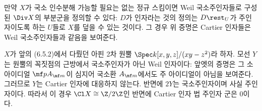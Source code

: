 	
	\begin{remark}
	만약 $X$가 국소 인수분해 가능할 필요는 없는 정규 스킴이면 Weil 국소주인자들로 구성된 $\Div X$의 부분군을 정의할 수 있다:
	$D$가 인자라는 것의 정의는 $D\rest_U$가 주인자이도록 하는 $U$들로 $X$를 덮을 수 있는 것이다.
	그 경우 위 증명은 Cartier 인자들은 Weil 국소주인자들과 같음을 보여준다.
	\end{remark}
	
	
	\begin{example}
	$X$가 앞의 (6.5.2)에서 다뤘던 아핀 2차 원뿔 $\Spec k[x,y,z]/(xy-z^2)$라 하자.
	모선 $Y$는 원뿔의 꼭짓점의 근방에서 국소주인자가 아닌 Weil 인자이다:
	앞엣의 증명은 그 소 아이디얼 $\mf pA_{\mf m}$이 심지어 국소환 $A_{\mf m}$에서도 주 아이디얼이 아님을 보여준다.
	그러므로 $Y$는 Cartier 인자에 대응하지 않는다. 반면에 $2Y$는 국소주인자이며 사실 주인자이다.
	따라서 이 경우 $\Cl X\cong\Z/2\Z$인 반면에 Cartier 인자 법 주인자 군은 0이다.
	\end{example}
	
